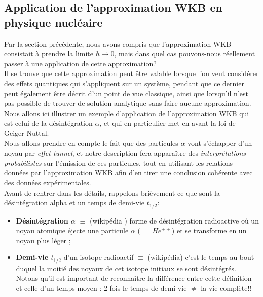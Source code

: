 \documentclass{book}
\begin{document}
\subsection{Application de l'approximation WKB en physique nucléaire}
Par la section précédente, nous avons compris que l'approximation WKB consistait à prendre la limite $\hbar \to 0$, mais dans quel cas pouvons-nous réellement passer à une application de cette approximation? \\
{\color{red}{Tentative d'explication mais le paragraphe en entier est à vérifier :}} Il se trouve que cette approximation peut être valable lorsque l'on veut considérer des effets quantiques qui s'appliquent sur un système, pendant que ce dernier peut également être décrit d'un point de vue classique, 
ainsi que lorsqu'il n'est pas possible de trouver de solution analytique sans faire aucune approximation. \\

Nous allons ici illustrer un exemple d'application de l'approximation WKB qui est celui de la désintégration-$\alpha$, et qui en particulier
met en avant la loi de Geiger-Nuttal. \\
Nous allons prendre en compte le fait que des particules $\alpha$ vont s'échapper d'un noyau par \textit{effet tunnel}, et notre description fera apparaître des \textit{interprétations probabilistes} sur l'émission de ces particules, 
tout en utilisant les relations données par l'approximation WKB afin d'en tirer une conclusion cohérente avec des données expérimentales. \\

Avant de rentrer dans les détails, rappelons brièvement ce que sont la désintégration alpha et un temps de demi-vie $t_{1/2}$: 
\begin{itemize}%
  \item \textbf{Désintégration $\alpha$} $\equiv$ (wikipédia {\color{red}{à vérifier}}) forme de désintégration radioactive où un noyau atomique éjecte une particule $\alpha$
  ( $= He^{++}$) et se transforme en un noyau plus léger ; 
  \item \textbf{Demi-vie $t_{1/2}$} d'un isotope radioactif $\equiv$ (wikipédia) c'est le temps au bout duquel la moitié des noyaux de cet isotope initiaux se sont désintégrés. \\
  Notons qu'il est important de reconnaître la différence entre cette définition et celle d'un temps moyen : 2 fois le temps de demi-vie $\ne$ la vie complète!!  
\end{itemize}
\end{document}
